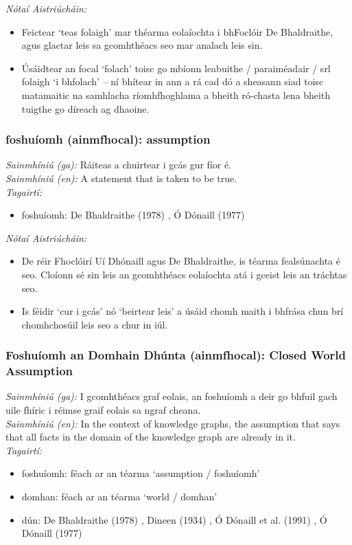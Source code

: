  \noindent \textit{Nótaí Aistriúcháin:}
\begin{itemize}
	\item Feictear `teas folaigh' mar théarma eolaíochta i bhFoclóir De Bhaldraithe, agus glactar leis sa gcomhthéacs seo mar analach leis sin.
	\item Úsáidtear an focal `folach' toisc go mbíonn leabuithe / paraiméadair / srl folaigh `i bhfolach' -- ní bhítear in ann a rá cad dó a sheasann siad toisc matamaitic na samhlacha ríomhfhoghlama a bheith ró-chasta lena bheith tuigthe go díreach ag dhaoine.
\end{itemize}


\subsubsection*{foshuíomh (ainmfhocal): assumption}
 \noindent \textit{Sainmhíniú (ga):} Ráiteas a chuirtear i gcás gur fíor é.
\\
 \noindent \textit{Sainmhíniú (en):} A statement that is taken to be true.
\\
 \noindent \textit{Tagairtí:}
\begin{itemize}
	\item foshuíomh: De Bhaldraithe (1978) \cite{de-bhaldraithe}, Ó Dónaill (1977) \cite{odonaill}
\end{itemize}

 \noindent \textit{Nótaí Aistriúcháin:}
\begin{itemize}
	\item De réir Fhoclóirí Uí Dhónaill agus De Bhaldraithe, is téarma fealsúnachta é seo. Cloíonn sé sin leis an gcomhthéacs eolaíochta atá i gceist leis an tráchtas seo.
	\item Is féidir `cur i gcás' nó `beirtear leis' a úsáid chomh maith i bhfrása chun brí chomhchosúil leis seo a chur in iúl.
\end{itemize}


\subsubsection*{Foshuíomh an Domhain Dhúnta (ainmfhocal): Closed World Assumption}
 \noindent \textit{Sainmhíniú (ga):} I gcomhthéacs graf eolais, an foshuíomh a deir go bhfuil gach uile fhíric i réimse graif eolais sa ngraf cheana.
\\
 \noindent \textit{Sainmhíniú (en):} In the context of knowledge graphs, the assumption that says that all facts in the domain of the knowledge graph are already in it.
\\
 \noindent \textit{Tagairtí:}
\begin{itemize}
	\item foshuíomh: féach ar an téarma `assumption / foshuíomh'
	\item domhan: féach ar an téarma `world / domhan'
	\item dún: De Bhaldraithe (1978) \cite{de-bhaldraithe}, Dineen (1934) \cite{dineen}, Ó Dónaill et al. (1991) \cite{focloir-beag}, Ó Dónaill (1977) \cite{odonaill}
\end{itemize}

